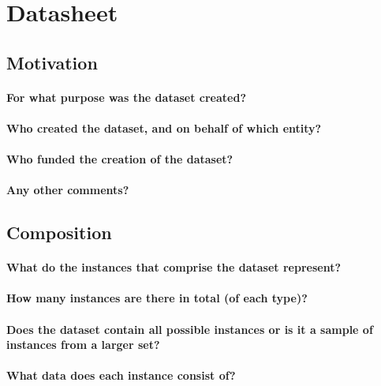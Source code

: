 \section{Datasheet}

\subsection{Motivation}

\paragraph{For what purpose was the dataset created?}

\paragraph{Who created the dataset, and on behalf of which entity?}

\paragraph{Who funded the creation of the dataset?}

\paragraph{Any other comments?}

\subsection{Composition}

\paragraph{What do the instances that comprise the dataset represent?}

\paragraph{How many instances are there in total (of each type)?}

\paragraph{Does the dataset contain all possible instances or is it a sample of instances from a larger set?}

\paragraph{What data does each instance consist of?}


